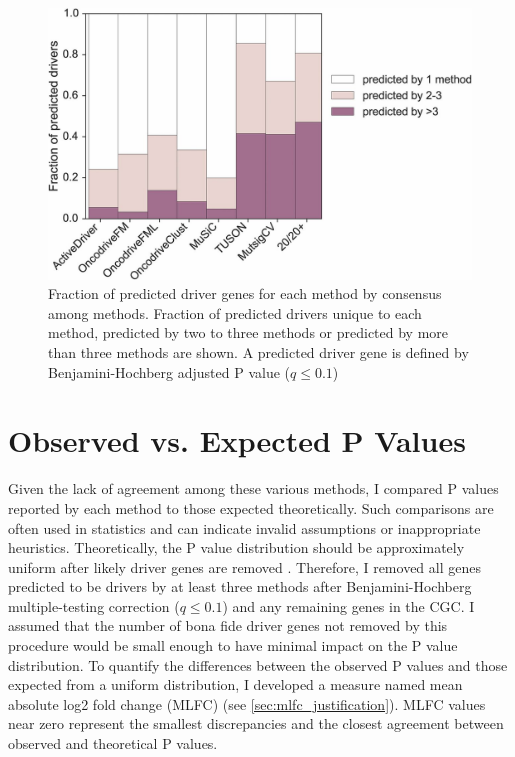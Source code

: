 \begin{figure}
  \centering
  \makeatletter
  \let\@currsize\normalsize
  \includegraphics[width=0.9\linewidth]{figures/chapter4/method_overlap.jpg}
  \caption{Fraction of predicted driver genes for each method by consensus among methods. Fraction of predicted drivers unique to each method, predicted by two to three methods or predicted by more than three methods are shown. A predicted driver gene is defined by Benjamini-Hochberg adjusted P value ($q \leq 0.1$)}
  \label{fig:benchmark_method_overlap}
\end{figure}

\section{Observed vs. Expected P Values}

Given the lack of agreement among these various methods, I compared P values reported by each method to those expected theoretically. Such comparisons are often used in statistics and can indicate invalid assumptions or inappropriate heuristics. Theoretically, the P value distribution should be approximately uniform after likely driver genes are removed \cite{RN188}. Therefore, I removed all genes predicted to be drivers by at least three methods after Benjamini-Hochberg multiple-testing correction ($q \leq 0.1$) and any remaining genes in the CGC. I assumed that the number of bona fide driver genes not removed by this procedure would be small enough to have minimal impact on the P value distribution. To quantify the differences between the observed P values and those expected from a uniform distribution, I developed a measure named mean absolute log2 fold change (MLFC) (see \autoref{sec:mlfc_justification}). MLFC values near zero represent the smallest discrepancies and the closest agreement between observed and theoretical P values.

